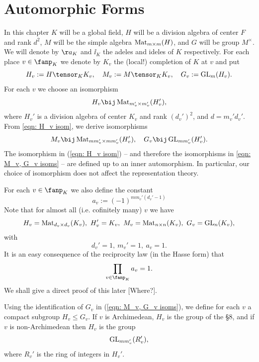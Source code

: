 \documentclass[11pt, x11names, openany]{book}
\begin{document}
\section{Automorphic Forms}
In this chapter $K$ will be a global field, $H$ will be a division algebra of center $F$ and rank $d^2$, $M$ will be the simple algebra $\operatorname{Mat}_{m \times m}(H)$, and $G$ will be group $M^\times$. We will denote by $\aa_K$ and $\ii_K$ the adeles and ideles of $K$ respectively. For each place $v \in \fanp_K$ we denote by $K_v$ the (local!) completion of $K$ at $v$ and put
\begin{equation*}
  H_v := H \tensor_K K_v, \quad M_v := M \tensor_K K_v, \quad G_v := \GL_m(H_v).
\end{equation*}
For each $v$ we choose an isomorphism
\begin{equation}
  \label{eqn: H_v isom}
  H_v \bij \mat_{m_v' \times m_v'}(H_v'),
\end{equation}
where $H_v'$ is a division algebra of center $K_v$ and rank $(d_v')^2$, and $d = m_v' d_v'$. From \ref{eqn: H_v isom}, we derive isomorphisms
\begin{equation}
  \label{eqn: M_v, G_v isoms}
  M_v \bij \mat_{m m_v' \times mm_v'}(H_v'), \quad G_v \bij \GL_{m m_v'}(H_v').
\end{equation}
The isomorphism in (\ref{eqn: H_v isom}) -- and therefore the isomorphisms in \ref{eqn: M_v, G_v isoms} -- are defined up to an inner automorphism. In particular, our choice of isomorphism does not affect the representation theory.

For each $v \in \fanp_K$ we also define the constant
\begin{equation}
  \label{eqn: a_v constant}
a_v := (-1)^{m m_v' (d_v' - 1)}
\end{equation}
Note that for almost all (i.e. cofinitely many) $v$ we have
\begin{equation*}
  H_v = \mat_{d_v \times d_v}(K_v), \ H_v' = K_v, \ M_v = \mat_{n \times n}(K_v), \ G_v = \GL_n(K_v),
\end{equation*}
with
\begin{equation*}
  d_v' = 1, \ m_v' = 1, \ a_v = 1.
\end{equation*} 
It is an easy consequence of the reciprocity law (in the Hasse form) that
\begin{equation*}
  \prod_{v \in \fanp_K} a_v = 1.
\end{equation*}
We shall give a direct proof of this later {\color{red} [Where?]}.

Using the identification of $G_v$ in (\ref{eqn: M_v, G_v isoms}), we define for each $v$ a compact subgroup $H_v \leq G_v$. If $v$ is Archimedean, $H_v$ is the group of the \S 8, and if $v$ is non-Archimedean then $H_v$ is the group 
\begin{equation*}
  \operatorname{GL}_{m m_v'}(R_v'),
\end{equation*}  
where $R_v'$ is the ring of integers in $H_v'$.
\end{document}
